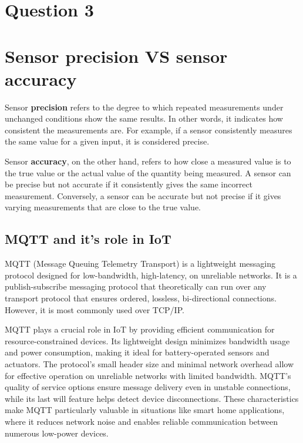 \section{Question 3}

\section{Sensor precision VS sensor accuracy}

Sensor \textbf{precision} refers to the degree to which repeated measurements under unchanged conditions show the same results. In other words, it indicates how consistent the measurements are. For example, if a sensor consistently measures the same value for a given input, it is considered precise.

Sensor \textbf{accuracy}, on the other hand, refers to how close a measured value is to the true value or the actual value of the quantity being measured. A sensor can be precise but not accurate if it consistently gives the same incorrect measurement. Conversely, a sensor can be accurate but not precise if it gives varying measurements that are close to the true value.

\subsection{MQTT and it's role in IoT}

MQTT (Message Queuing Telemetry Transport) is a lightweight messaging protocol designed for low-bandwidth, high-latency, on unreliable networks\cite{mqtt_org}. 
It is a publish-subscribe messaging protocol that theoretically can run over any transport protocol that ensures ordered, lossless, bi-directional connections. However, it is most commonly used over TCP/IP.

MQTT plays a crucial role in IoT by providing efficient communication for resource-constrained devices. Its lightweight design minimizes bandwidth usage and power consumption, making it ideal for battery-operated sensors and actuators. The protocol's small header size and minimal network overhead allow for effective operation on unreliable networks with limited bandwidth. MQTT's quality of service options ensure message delivery even in unstable connections, while its last will feature helps detect device disconnections. These characteristics make MQTT particularly valuable in situations like smart home applications, where it reduces network noise and enables reliable communication between numerous low-power devices.

